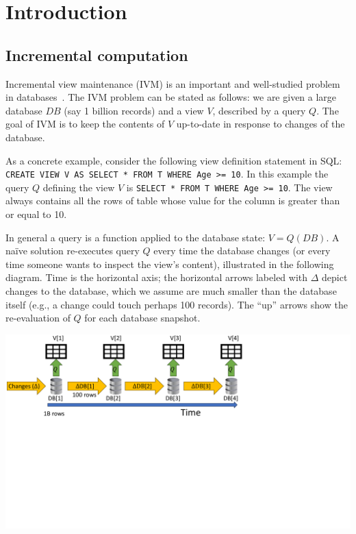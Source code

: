 \section{Introduction}\label{sec:introduction}

\subsection{Incremental computation}\label{sec:intro-incremental}

Incremental view maintenance (IVM) is an important and well-studied
problem in databases~\cite{gupta-idb95}.  The IVM problem can be
stated as follows: we are given a large database $DB$ (say 1 billion
records) and a view $V$, described by a query $Q$.  The goal of IVM is
to keep the contents of $V$ up-to-date in response to changes of the
database.

As a concrete example, consider the following view definition
statement in SQL: \texttt{CREATE VIEW V AS SELECT * FROM T WHERE Age
  >= 10}.  In this example the query $Q$ defining the view $V$ is
\texttt{SELECT * FROM T WHERE Age >= 10}.  The view  always
contains all the rows of table  whose value for the column
 is greater than or equal to 10.

In general a query is a function applied to the database state: $V =
Q(DB)$.  A na\"ive solution re-executes query $Q$ every time the
database changes (or every time someone wants to inspect the view's
content), illustrated in the following diagram.  Time is the
horizontal axis; the horizontal arrows labeled with $\Delta$ depict
changes to the database, which we assume are much smaller than the
database itself (e.g., a change could touch perhaps 100 records).  The
``up'' arrows show the re-evaluation of $Q$ for each database
snapshot.

\includegraphics[trim={0 4.2in 4.2in 0},clip,scale=.30]{view.pdf}

